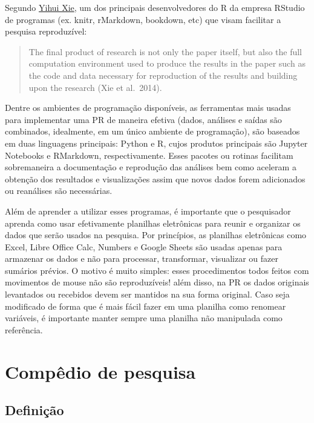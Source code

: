 \documentclass[]{book}
\begin{document}
Segundo \href{https://yihui.name}{Yihui Xie}, um dos principais
desenvolvedores do R da empresa RStudio de programas (ex. knitr,
rMarkdown, bookdown, etc) que visam facilitar a pesquisa reproduzível:

\begin{quote}
The final product of research is not only the paper itself, but also the
full computation environment used to produce the results in the paper
such as the code and data necessary for reproduction of the results and
building upon the research (Xie et al.~2014).
\end{quote}

Dentre os ambientes de programação disponíveis, as ferramentas mais
usadas para implementar uma PR de maneira efetiva (dados, análises e
saídas são combinados, idealmente, em um único ambiente de programação),
são baseados em duas linguagens principais: Python e R, cujos produtos
principais são Jupyter Notebooks e RMarkdown, respectivamente. Esses
pacotes ou rotinas facilitam sobremaneira a documentação e reprodução
das análises bem como aceleram a obtenção dos resultados e visualizações
assim que novos dados forem adicionados ou reanálises são necessárias.

Além de aprender a utilizar esses programas, é importante que o
pesquisador aprenda como usar efetivamente planilhas eletrônicas para
reunir e organizar os dados que serão usados na pesquisa. Por
princípios, as planilhas eletrônicas como Excel, Libre Office Calc,
Numbers e Google Sheets são usadas apenas para armazenar os dados e não
para processar, transformar, visualizar ou fazer sumários prévios. O
motivo é muito simples: esses procedimentos todos feitos com movimentos
de mouse não são reproduzíveis! além disso, na PR os dados originais
levantados ou recebidos devem ser mantidos na sua forma original. Caso
seja modificado de forma que é mais fácil fazer em uma planilha como
renomear variáveis, é importante manter sempre uma planilha não
manipulada como referência.

\hypertarget{compedio-de-pesquisa}{%
\chapter{Compêdio de pesquisa}\label{compedio-de-pesquisa}}

\hypertarget{definicao}{%
\section{Definição}\label{definicao}}
\end{document}
